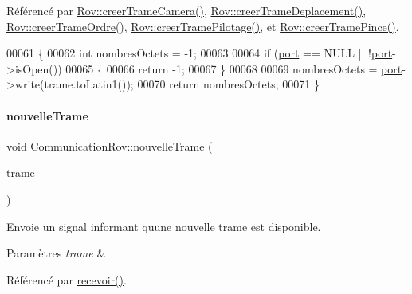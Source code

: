 Référencé par \hyperlink{rov_8cpp_source_l00251}{Rov\+::creer\+Trame\+Camera()}, \hyperlink{rov_8cpp_source_l00208}{Rov\+::creer\+Trame\+Deplacement()}, \hyperlink{rov_8cpp_source_l00230}{Rov\+::creer\+Trame\+Ordre()}, \hyperlink{rov_8cpp_source_l00219}{Rov\+::creer\+Trame\+Pilotage()}, et \hyperlink{rov_8cpp_source_l00240}{Rov\+::creer\+Trame\+Pince()}.


\begin{DoxyCode}
00061 \{
00062     \textcolor{keywordtype}{int} nombresOctets = -1;
00063 
00064     \textcolor{keywordflow}{if} (\hyperlink{class_communication_rov_a21b62067ef0b2a6aec339df60b4abd72}{port} == NULL || !\hyperlink{class_communication_rov_a21b62067ef0b2a6aec339df60b4abd72}{port}->isOpen())
00065     \{
00066        \textcolor{keywordflow}{return} -1;
00067     \}
00068 
00069     nombresOctets = \hyperlink{class_communication_rov_a21b62067ef0b2a6aec339df60b4abd72}{port}->write(trame.toLatin1());
00070     \textcolor{keywordflow}{return} nombresOctets;
00071 \}
\end{DoxyCode}
\mbox{\label{class_communication_rov_a78ee383e056cec7e8b24f3f9e472f60f}} 
\paragraph{\texorpdfstring{nouvelle\+Trame}{nouvelleTrame}}
{\footnotesize\ttfamily void Communication\+Rov\+::nouvelle\+Trame (\begin{DoxyParamCaption}\item[{Q\+String}]{trame }\end{DoxyParamCaption})\hspace{0.3cm}{\ttfamily [signal]}}



Envoie un signal informant qu\textquotesingle{}une nouvelle trame est disponible. 


\begin{DoxyParams}{Paramètres}
{\em trame} & \\
\hline
\end{DoxyParams}


Référencé par \hyperlink{communicationrov_8cpp_source_l00073}{recevoir()}.

\mbox{\label{class_communication_rov_acc835a6d927b1b8cd631e64ffabca0b4}} 
